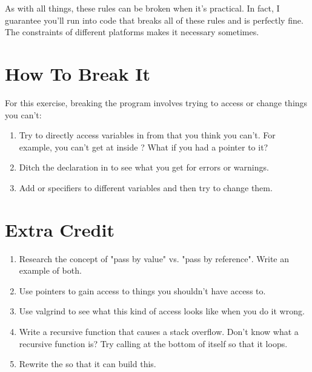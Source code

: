 As with all things, these rules can be broken when it's practical.  In fact,
I guarantee you'll run into code that breaks all of these rules and is perfectly
fine.  The constraints of different platforms makes it necessary sometimes.

\section{How To Break It}

For this exercise, breaking the program involves trying to access or change
things you can't:

\begin{enumerate}
\item Try to directly access variables in  from 
    that you think you can't.  For example, you can't get at 
    inside ? What if you had a pointer to it?
\item Ditch the  declaration in  to see what you
    get for errors or warnings.
\item Add  or  specifiers to different variables
    and then try to change them.
\end{enumerate}


\section{Extra Credit}

\begin{enumerate}
\item Research the concept of "pass by value" vs. "pass by reference".  Write an
    example of both.
\item Use pointers to gain access to things you shouldn't have access to.
\item Use valgrind to see what this kind of access looks like when you 
    do it wrong.
\item Write a recursive function that causes a stack overflow.  Don't know
    what a recursive function is?  Try calling  at the
    bottom of  itself so that it loops.
\item Rewrite the  so that it can build this.
\end{enumerate}

